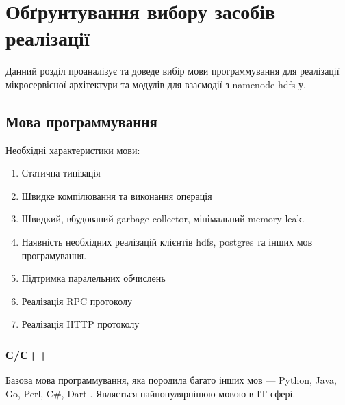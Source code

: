 
\chapter{Обґрунтування вибору засобів реалізації}

Данний розділ проаналізує та доведе вибір мови программування для реалізації мікросервісної архітектури 
та модулів для взаємодії з namenode hdfs-у.

\section{Мова программування}

Необхідні характеристики мови:

\begin{enumerate}
    \item Статична типізація
    \item Швидке компілювання та виконання операція
    \item Швидкий, вбудований garbage collector, мінімальний memory leak.
    \item Наявність необхідних реалізацій клієнтів hdfs, postgres та інших мов програмування.
    \item Підтримка паралельних обчислень
    \item Реалізація RPC протоколу
    \item Реалізація HTTP протоколу
\end{enumerate}

    \subsection{С/С++}

    Базова мова программування, яка породила багато інших мов --- Python, Java, Go, Perl, C\#, Dart \cite{lang2019cfamily}.
    Являється найпопулярнішою мовою в IT сфері.


